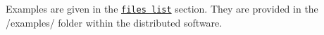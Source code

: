 Examples are given in the \href{files.html}{\tt files list} section. They are provided in the /examples/ folder within the distributed software. 